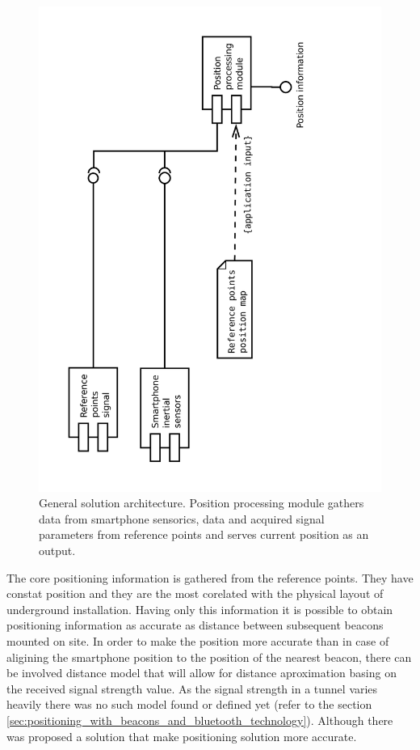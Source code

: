\documentclass[../main.tex]{subfiles}
\begin{document}
\begin{figure}[!htbp]
\includegraphics[height=\textwidth, angle=270, trim={0 0 4cm 0},clip]{pictures/architecture_general.pdf}
\centering
\caption{General solution architecture. Position processing module gathers data from smartphone sensorics, data and acquired signal parameters from reference points and serves current position as an output.}
\label{fig:architecture_general}
\end{figure}

The core positioning information is gathered from the reference points. They have constat position and they are the most corelated with the physical layout of underground installation. Having only this information it is possible to obtain positioning information as accurate as distance between subsequent beacons mounted on site. In order to make the position more accurate than in case of aligining the smartphone position to the position of the nearest beacon, there can be involved distance model that will allow for distance aproximation basing on the received signal strength value. As the signal strength in a tunnel varies heavily there was no such model found or defined yet (refer to the section \ref{sec:positioning_with_beacons_and_bluetooth_technology}). Although there was proposed a solution that make positioning solution more accurate.
\end{document}
